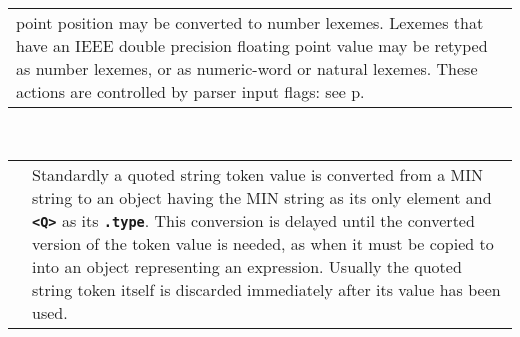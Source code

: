 \documentclass[12pt]{article}
\newcommand{\TT}[1]{{\tt \bfseries #1}}
\newcommand{\pagref}[1]{p\pageref{#1}}
\newenvironment{indpar}[1][0.3in]%
	{\begin{list}{}%
		     {\setlength{\itemsep}{0in}%
		      \setlength{\topsep}{0in}%
		      \setlength{\parsep}{1ex}%
		      \setlength{\labelwidth}{#1}%
		      \setlength{\leftmargin}{#1}%
		      \addtolength{\leftmargin}{\labelsep}}%
	 \item}%
	{\end{list}}
\begin{document}
\begin{indpar}
\begin{tabular}{p{1in}p{4.5in}}
		  point position may be converted to number lexemes.
		  Lexemes that have an IEEE double precision floating
		  point value may be retyped as number lexemes, or
		  as numeric-word or natural lexemes.  These actions
		  are controlled by parser input flags: see
		  \pagref{NUMBER-LEXEME-RETYPING}.
\end{tabular}
\\[1ex]  
\begin{tabular}{p{1in}p{4.5in}}
		& Standardly a quoted string token value is converted
		  from a MIN string to an object having the MIN string
		  as its only element and \TT{<Q>} as its \TT{.type}.
		  This conversion is delayed until
		  the converted version of the token value is
		  needed, as when it must be copied to into
		  an object representing an expression.
		  Usually the quoted string token itself is discarded
		  immediately after its value has been used.
\end{tabular}
\\[1ex]  
\begin{tabular}{p{1in}p{4.5in}}


\end{tabular}
\end{indpar}
\end{document}
